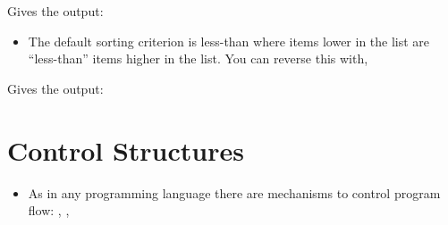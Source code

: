 \documentclass[letterpaper,10pt,english,openany]{sphinxmanual}
\begin{document}
Gives the output:

\begin{sphinxVerbatim}[commandchars=\\\{\}]
[5, 4, 3, 2, 7]
[2, 3, 4, 5, 7]
\end{sphinxVerbatim}
\begin{itemize}
\item {} 
The default sorting criterion is less-than where items lower in the
list are “less-than” items higher in the list. You can reverse this
with,

\end{itemize}

\begin{sphinxVerbatim}[commandchars=\\\{\}]
  \PYG{p}{[}\PYG{p}{]}
  
\end{sphinxVerbatim}

Gives the output:

\begin{sphinxVerbatim}[commandchars=\\\{\}]
[7, 5, 4, 3, 2]
\end{sphinxVerbatim}



\section{Control Structures}
\label{\detokenize{introduction_to_python/control_structures:control-structures}}\label{\detokenize{introduction_to_python/control_structures:id1}}\label{\detokenize{introduction_to_python/control_structures::doc}}\begin{itemize}
\item {} 
As in any programming language there are mechanisms to control
program flow: , , 

\end{itemize}
\end{document}
